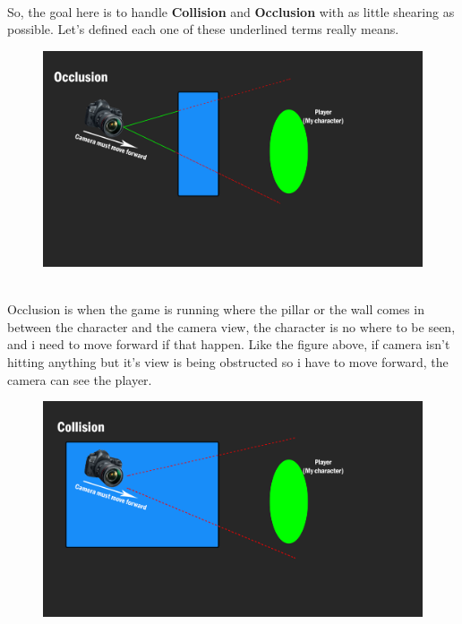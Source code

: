 \documentclass[a4paper, 13pt]{extarticle}
\begin{document}
  \\[0.15cm]
  So, the goal here is to handle {\bfseries Collision} and {\bfseries Occlusion} with as little shearing as possible. Let's defined each one of these underlined terms really means. 
  \begin{figure}[h]
  	\centering
  	\begin{minipage}{.4\textwidth}
  		\centering
  		\includegraphics[width=1.3\linewidth]{intructions/Occlusion_camera.png}
  		\centering
  		\label{fig:test10}
  	\end{minipage}
  \end{figure}
  \\[0.15cm]
  Occlusion is when the game is running where the pillar or the wall comes in between the character and the camera view, the character is no where to be seen, and i need to move forward if that happen. Like the figure above, if camera isn't hitting anything but it's view is being obstructed so i have to move forward, the camera can see the player. 
  \begin{figure}[h]
  	\centering
  	\begin{minipage}{.4\textwidth}
  		\centering
  		\includegraphics[width=1.3\linewidth]{intructions/Collision_camera.png}
  		\centering
  		\label{fig:test11}
  	\end{minipage}
  \end{figure}
\end{document}
